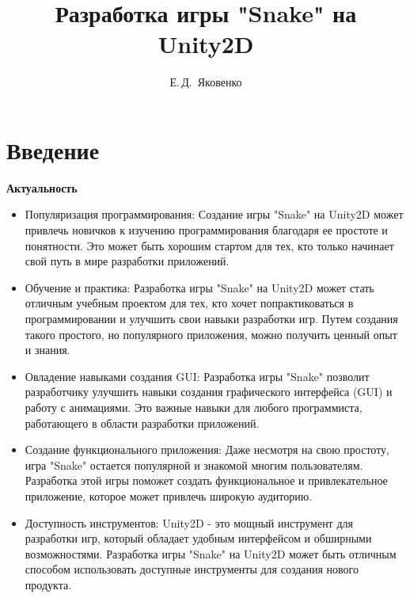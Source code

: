 \documentclass[14pt, oneside]{altsu-report}
\title{Разработка игры "Snake" на Unity2D}
\author{Е.\,Д.~Яковенко}
\institute{Институт цифровых технологий, электроники и физики}
\date{\the\year}
\begin{document}
\maketitle

\setcounter{page}{2}
\makeabstract
\tableofcontents

\chapter*{Введение}

\textbf{Актуальность}
\begin{itemize}
\item {Популяризация программирования: Создание игры "Snake" на Unity2D может привлечь новичков к изучению программирования благодаря ее простоте и понятности. Это может быть хорошим стартом для тех, кто только начинает свой путь в мире разработки приложений.}

\item {Обучение и практика: Разработка игры "Snake" на Unity2D может стать отличным учебным проектом для тех, кто хочет попрактиковаться в программировании и улучшить свои навыки разработки игр. Путем создания такого простого, но популярного приложения, можно получить ценный опыт и знания.}

\item {Овладение навыками создания GUI: Разработка игры "Snake" позволит разработчику улучшить навыки создания графического интерфейса (GUI) и работу с анимациями. Это важные навыки для любого программиста, работающего в области разработки приложений.}

\item {Создание функционального приложения: Даже несмотря на свою простоту, игра "Snake" остается популярной и знакомой многим пользователям. Разработка этой игры поможет создать функциональное и привлекательное приложение, которое может привлечь широкую аудиторию.}

\item {Доступность инструментов: Unity2D - это мощный инструмент для разработки игр, который обладает удобным интерфейсом и обширными возможностями. Разработка игры "Snake" на Unity2D может быть отличным способом использовать доступные инструменты для создания нового продукта.}

\end{itemize}
\end{document}
